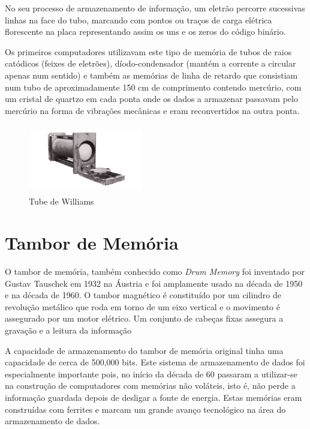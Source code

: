 \documentclass{report}
\begin{document}
	No seu processo de armazenamento de informação, um eletrão percorre sucessivas linhas na face do tubo, marcando com pontos ou traços de carga elétrica florescente na placa representando assim os uns e os zeros do código binário.
	
	Os primeiros computadores utilizavam este tipo de memória de tubos de raios catódicos (feixes de eletrões), díodo-condensador (mantém a corrente a circular apenas num sentido) e também as memórias de linha de retardo que consistiam num tubo de aproximadamente 150 cm de comprimento contendo mercúrio, com um cristal de quartzo em cada ponta onde os dados a armazenar passavam pelo mercúrio na forma de vibrações mecânicas e eram reconvertidos na outra ponta.
\vspace{10mm}

	\begin{figure}[h]
		\centering
		\includegraphics[width=5cm, height=3cm]{williamstube.jpg}
		\caption{Tube de Williams}
		\end{figure}	
\newpage

		
		\section{Tambor de Memória}
		 O tambor de memória, também conhecido como\textit{ Drum Memory} foi inventado por Gustav Tauschek em 1932 na Áustria e foi amplamente usado na década de 1950 e na década de 1960.
		 O tambor magnético é constituído por um cilindro de revolução metálico que roda em torno de um eixo vertical e o movimento é assegurado por um motor elétrico. Um conjunto de cabeças fixas assegura a gravação e a leitura da informação
		 
		 A capacidade de armazenamento do tambor de memória original tinha uma capacidade de cerca de 500,000 bits. Este sistema de armazenamento de dados foi especialmente importante pois, no início da década de 60 passaram a utilizar-se na construção de computadores com memórias não voláteis, isto é, não perde a informação guardada depois de desligar a fonte de energia. Estas memórias eram construídas com ferrites e marcam um grande avanço tecnológico na área do armazenamento de dados.
\vspace{30mm}	
	
\end{document}
